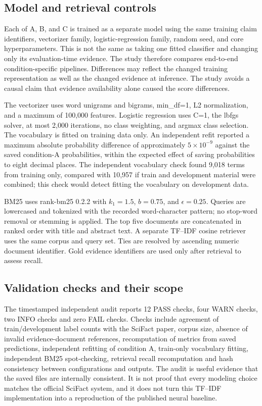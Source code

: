 \documentclass[10pt]{article}
\begin{document}
\subsection{Model and retrieval controls}
Each of A, B, and C is trained as a separate model using the same training claim identifiers, vectorizer family, logistic-regression family, random seed, and core hyperparameters. This is not the same as taking one fitted classifier and changing only its evaluation-time evidence. The study therefore compares end-to-end condition-specific pipelines. Differences may reflect the changed training representation as well as the changed evidence at inference. The study avoids a causal claim that evidence availability alone caused the score differences.

The vectorizer uses word unigrams and bigrams, min\_df=1, L2 normalization, and a maximum of 100,000 features. Logistic regression uses C=1, the lbfgs solver, at most 2,000 iterations, no class weighting, and argmax class selection. The vocabulary is fitted on training data only. An independent refit reported a maximum absolute probability difference of approximately $5\times10^{-9}$ against the saved condition-A probabilities, within the expected effect of saving probabilities to eight decimal places. The independent vocabulary check found 9,018 terms from training only, compared with 10,957 if train and development material were combined; this check would detect fitting the vocabulary on development data.

BM25 uses rank-bm25 0.2.2 with $k_1=1.5$, $b=0.75$, and $\epsilon=0.25$. Queries are lowercased and tokenized with the recorded word-character pattern; no stop-word removal or stemming is applied. The top five documents are concatenated in ranked order with title and abstract text. A separate TF--IDF cosine retriever uses the same corpus and query set. Ties are resolved by ascending numeric document identifier. Gold evidence identifiers are used only after retrieval to assess recall.

\subsection{Validation checks and their scope}
The timestamped independent audit reports 12 PASS checks, four WARN checks, two INFO checks and zero FAIL checks. Checks include agreement of train/development label counts with the SciFact paper, corpus size, absence of invalid evidence-document references, recomputation of metrics from saved predictions, independent refitting of condition A, train-only vocabulary fitting, independent BM25 spot-checking, retrieval recall recomputation and hash consistency between configurations and outputs. The audit is useful evidence that the saved files are internally consistent. It is not proof that every modeling choice matches the official SciFact system, and it does not turn this TF--IDF implementation into a reproduction of the published neural baseline.
\end{document}
